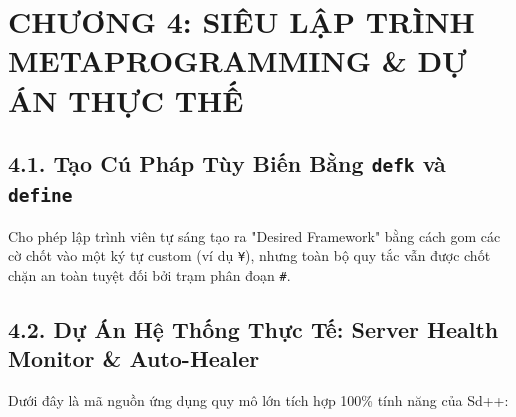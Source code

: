\documentclass[11pt, a4paper]{article}
\begin{document}
\section{CHƯƠNG 4: SIÊU LẬP TRÌNH METAPROGRAMMING \& DỰ ÁN THỰC THẾ}

\subsection{4.1. Tạo Cú Pháp Tùy Biến Bằng \texttt{defk} và \texttt{define}}
Cho phép lập trình viên tự sáng tạo ra "Desired Framework" bằng cách gom các cờ chốt vào một ký tự custom (ví dụ \texttt{¥}), nhưng toàn bộ quy tắc vẫn được chốt chặn an toàn tuyệt đối bởi trạm phân đoạn \texttt{\#}.

\subsection{4.2. Dự Án Hệ Thống Thực Tế: Server Health Monitor \& Auto-Healer}
Dưới đây là mã nguồn ứng dụng quy mô lớn tích hợp 100\% tính năng của Sd++:
\end{document}
